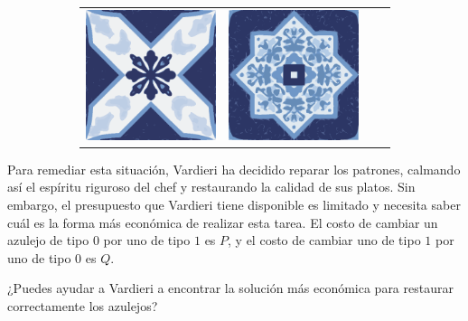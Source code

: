 \documentclass{oci}
\begin{document}
\begin{problemDescription}
\begin{figure}[h]
\begin{subfigure}{0.45\textwidth}
\begin{center}
{\begin{tabular}{cccc}
        \includegraphics[scale=0.3]{b.eps} &
        \includegraphics[scale=0.3]{a.eps}
      \end{tabular}
    }
  \end{center}
\end{subfigure}
\end{figure}

Para remediar esta situación, Vardieri ha decidido reparar los patrones, calmando
así el espíritu riguroso del chef y restaurando la calidad de sus platos.
Sin embargo, el presupuesto que Vardieri tiene disponible es limitado y necesita saber cuál es la forma más económica de realizar esta tarea.
El costo de cambiar un azulejo de tipo $0$ por uno de tipo $1$ es $P$, y el costo
de cambiar uno de tipo $1$ por uno de tipo $0$ es $Q$.


¿Puedes ayudar a Vardieri a encontrar la solución más económica para restaurar correctamente los azulejos?

\end{problemDescription}
\end{document}
